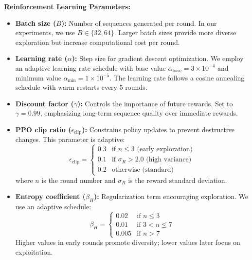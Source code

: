 \documentclass[conference]{IEEEtran}
\begin{document}
\textbf{Reinforcement Learning Parameters:}
\begin{itemize}
    \item \textbf{Batch size ($B$):} Number of sequences generated per round. In our experiments, we use $B \in \{32, 64\}$. Larger batch sizes provide more diverse exploration but increase computational cost per round.
    
    \item \textbf{Learning rate ($\alpha$):} Step size for gradient descent optimization. We employ an adaptive learning rate schedule with base value $\alpha_{\text{base}} = 3 \times 10^{-4}$ and minimum value $\alpha_{\text{min}} = 1 \times 10^{-5}$. The learning rate follows a cosine annealing schedule with warm restarts every 5 rounds.
    
    \item \textbf{Discount factor ($\gamma$):} Controls the importance of future rewards. Set to $\gamma = 0.99$, emphasizing long-term sequence quality over immediate rewards.
    
    \item \textbf{PPO clip ratio ($\epsilon_{\text{clip}}$):} Constrains policy updates to prevent destructive changes. This parameter is adaptive:
    \begin{equation}
    \epsilon_{\text{clip}} = \begin{cases}
    0.3 & \text{if } n \leq 3 \text{ (early exploration)} \\
    0.1 & \text{if } \sigma_R > 2.0 \text{ (high variance)} \\
    0.2 & \text{otherwise (standard)}
    \end{cases}
    \end{equation}
    where $n$ is the round number and $\sigma_R$ is the reward standard deviation.
    
    \item \textbf{Entropy coefficient ($\beta_H$):} Regularization term encouraging exploration. We use an adaptive schedule:
    \begin{equation}
    \beta_H = \begin{cases}
    0.02 & \text{if } n \leq 3 \\
    0.01 & \text{if } 3 < n \leq 7 \\
    0.005 & \text{if } n > 7
    \end{cases}
    \end{equation}
    Higher values in early rounds promote diversity; lower values later focus on exploitation.
\end{itemize}
\end{document}
